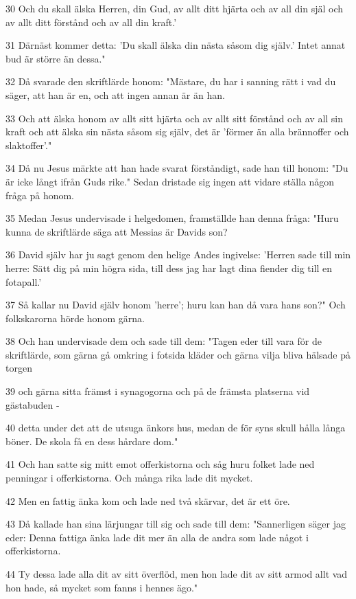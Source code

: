 \par 30 Och du skall älska Herren, din Gud, av allt ditt hjärta och av all din själ och av allt ditt förstånd och av all din kraft.'
\par 31 Därnäst kommer detta: 'Du skall älska din nästa såsom dig själv.' Intet annat bud är större än dessa."
\par 32 Då svarade den skriftlärde honom: "Mästare, du har i sanning rätt i vad du säger, att han är en, och att ingen annan är än han.
\par 33 Och att älska honom av allt sitt hjärta och av allt sitt förstånd och av all sin kraft och att älska sin nästa såsom sig själv, det är 'förmer än alla brännoffer och slaktoffer'."
\par 34 Då nu Jesus märkte att han hade svarat förståndigt, sade han till honom: "Du är icke långt ifrån Guds rike." Sedan dristade sig ingen att vidare ställa någon fråga på honom.
\par 35 Medan Jesus undervisade i helgedomen, framställde han denna fråga: "Huru kunna de skriftlärde säga att Messias är Davids son?
\par 36 David själv har ju sagt genom den helige Andes ingivelse: 'Herren sade till min herre: Sätt dig på min högra sida, till dess jag har lagt dina fiender dig till en fotapall.'
\par 37 Så kallar nu David själv honom 'herre'; huru kan han då vara hans son?" Och folkskarorna hörde honom gärna.
\par 38 Och han undervisade dem och sade till dem: "Tagen eder till vara för de skriftlärde, som gärna gå omkring i fotsida kläder och gärna vilja bliva hälsade på torgen
\par 39 och gärna sitta främst i synagogorna och på de främsta platserna vid gästabuden -
\par 40 detta under det att de utsuga änkors hus, medan de för syns skull hålla långa böner. De skola få en dess hårdare dom."
\par 41 Och han satte sig mitt emot offerkistorna och såg huru folket lade ned penningar i offerkistorna. Och många rika lade dit mycket.
\par 42 Men en fattig änka kom och lade ned två skärvar, det är ett öre.
\par 43 Då kallade han sina lärjungar till sig och sade till dem: "Sannerligen säger jag eder: Denna fattiga änka lade dit mer än alla de andra som lade något i offerkistorna.
\par 44 Ty dessa lade alla dit av sitt överflöd, men hon lade dit av sitt armod allt vad hon hade, så mycket som fanns i hennes ägo."

